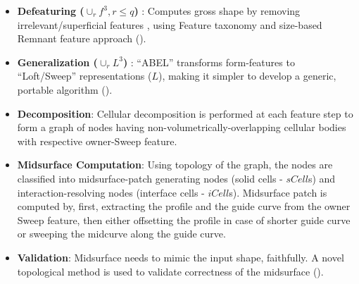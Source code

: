 \begin{minipage}[c]{0.98\linewidth}
    \begin{minipage}[c]{0.55\linewidth}
\begin{itemize}[noitemsep,topsep=2pt,parsep=2pt,partopsep=2pt,leftmargin=*]

\item \textbf{Defeaturing ($\cup_rf^3, r \leq q$) }:  Computes gross shape by removing irrelevant/superficial features \cite{YogeshIITM2013}, using Feature taxonomy and size-based Remnant feature approach (\cite{YogeshCADConf2015}). 

\item \textbf{Generalization ($\cup_rL^3$) }: ``ABEL'' transforms form-features to ``Loft/Sweep'' representations ($L$), making it simpler to develop a generic, portable algorithm (\cite{YogeshIITG2014}). 

\item \textbf{Decomposition}: Cellular decomposition is performed at each feature step to form a graph of nodes having non-volumetrically-overlapping cellular bodies with respective owner-Sweep feature. 

\item \textbf{Midsurface Computation}: Using topology of the graph, the nodes are classified into midsurface-patch generating nodes (solid cells - $sCell$s) and interaction-resolving nodes (interface cells - $iCell$s). Midsurface patch is computed by, first, extracting the profile and the guide curve from the owner Sweep feature, then either offsetting the profile in case of shorter guide curve or sweeping the midcurve \cite{YogeshETES2014,YogeshIJCAET2017} along the guide curve.

\item \textbf{Validation}:  Midsurface needs to  mimic the input shape, faithfully. A novel topological method is used to validate correctness of the midsurface (\cite{YogeshCADandA2015}).


\end{itemize}
\end{minipage}
\end{minipage}
